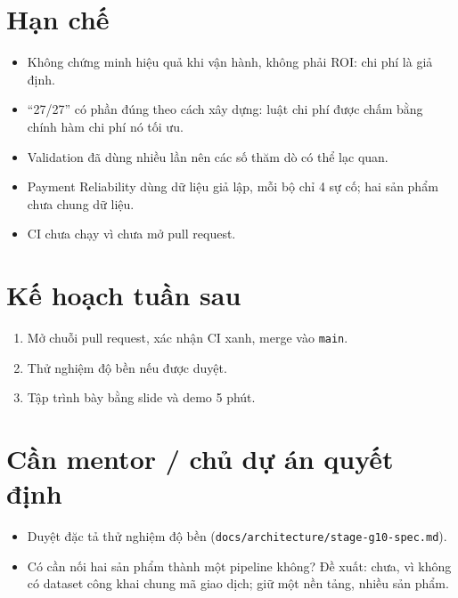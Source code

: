 \documentclass[11pt,a4paper]{article}
\begin{document}
\section{Hạn chế}

\begin{itemize}
  \item Không chứng minh hiệu quả khi vận hành, không phải ROI: chi phí là giả định.
  \item “27/27” có phần đúng theo cách xây dựng: luật chi phí được chấm bằng chính hàm chi phí nó tối ưu.
  \item Validation đã dùng nhiều lần nên các số thăm dò có thể lạc quan.
  \item Payment Reliability dùng dữ liệu giả lập, mỗi bộ chỉ 4 sự cố; hai sản phẩm chưa chung dữ liệu.
  \item CI chưa chạy vì chưa mở pull request.
\end{itemize}

\section{Kế hoạch tuần sau}

\begin{enumerate}
  \item Mở chuỗi pull request, xác nhận CI xanh, merge vào \texttt{main}.
  \item Thử nghiệm độ bền nếu được duyệt.
  \item Tập trình bày bằng slide và demo 5 phút.
\end{enumerate}

\section{Cần mentor / chủ dự án quyết định}

\begin{itemize}
  \item Duyệt đặc tả thử nghiệm độ bền (\texttt{docs/architecture/stage-g10-spec.md}).
  \item Có cần nối hai sản phẩm thành một pipeline không? Đề xuất: chưa, vì không có dataset công khai
        chung mã giao dịch; giữ một nền tảng, nhiều sản phẩm.
\end{itemize}
\end{document}
